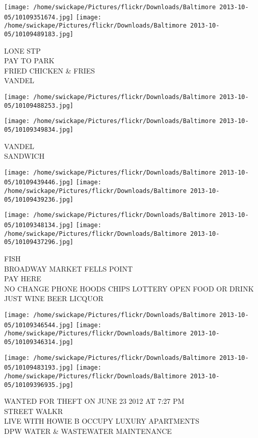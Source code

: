 \documentclass[10pt,letterpaper]{article}
\begin{document}
\texttt{[image: /home/swickape/Pictures/flickr/Downloads/Baltimore 2013-10-05/10109351674.jpg]}
\texttt{[image: /home/swickape/Pictures/flickr/Downloads/Baltimore 2013-10-05/10109489183.jpg]}

LONE STP\\
PAY TO PARK\\
FRIED CHICKEN \& FRIES\\
VANDEL
\pagebreak

\texttt{[image: /home/swickape/Pictures/flickr/Downloads/Baltimore 2013-10-05/10109488253.jpg]}

\vspace{0.25in}
\texttt{[image: /home/swickape/Pictures/flickr/Downloads/Baltimore 2013-10-05/10109349834.jpg]}

VANDEL\\
SANDWICH
\pagebreak

\texttt{[image: /home/swickape/Pictures/flickr/Downloads/Baltimore 2013-10-05/10109439446.jpg]}
\texttt{[image: /home/swickape/Pictures/flickr/Downloads/Baltimore 2013-10-05/10109439236.jpg]}

\texttt{[image: /home/swickape/Pictures/flickr/Downloads/Baltimore 2013-10-05/10109348134.jpg]}
\texttt{[image: /home/swickape/Pictures/flickr/Downloads/Baltimore 2013-10-05/10109437296.jpg]}

FISH\\
BROADWAY MARKET FELLS POINT\\
PAY HERE\\
NO CHANGE PHONE HOODS CHIPS LOTTERY OPEN FOOD OR DRINK JUST WINE BEER LICQUOR
\pagebreak

\texttt{[image: /home/swickape/Pictures/flickr/Downloads/Baltimore 2013-10-05/10109346544.jpg]}
\texttt{[image: /home/swickape/Pictures/flickr/Downloads/Baltimore 2013-10-05/10109346314.jpg]}

\texttt{[image: /home/swickape/Pictures/flickr/Downloads/Baltimore 2013-10-05/10109483193.jpg]}
\texttt{[image: /home/swickape/Pictures/flickr/Downloads/Baltimore 2013-10-05/10109396935.jpg]}

WANTED FOR THEFT ON JUNE 23 2012 AT 7:27 PM\\
STREET WALKR\\
LIVE WITH HOWIE B OCCUPY LUXURY APARTMENTS\\
DPW WATER \& WASTEWATER MAINTENANCE
\pagebreak
\end{document}
